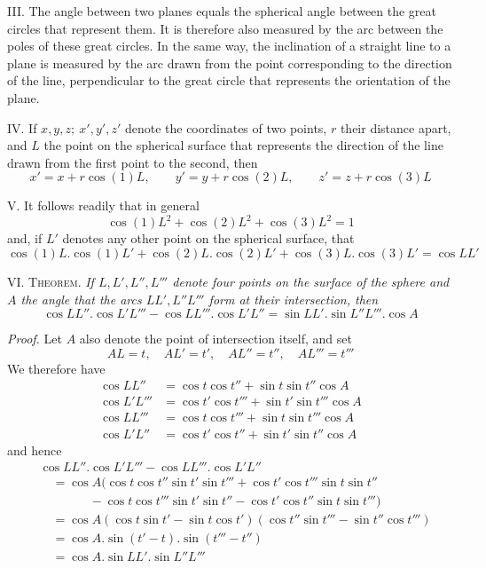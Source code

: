 \par\indent{}%
III. The angle between two planes equals the spherical angle between the great circles that represent them. It is therefore also measured by the arc between the poles of these great circles. In the same way, the inclination of a straight line to a plane is measured by the arc drawn from the point corresponding to the direction of the line, perpendicular to the great circle that represents the orientation of the plane.

IV. If \(x,y,z;\ x',y',z'\) denote the coordinates of two points, \(r\) their distance apart, and \(L\) the point on the spherical surface that represents the direction of the line drawn from the first point to the second, then
\[
x'=x+r\cos(1)L,\qquad y'=y+r\cos(2)L,\qquad z'=z+r\cos(3)L
\]
\par\indent V. It follows readily that in general
\[
\cos(1)L^2+\cos(2)L^2+\cos(3)L^2=1
\]
\noindent and, if \(L'\) denotes any other point on the spherical surface, that
\[
\cos(1)L\mathord{.}\cos(1)L'+\cos(2)L\mathord{.}\cos(2)L'+\cos(3)L\mathord{.}\cos(3)L'=\cos LL'
\]
\par\indent VI. \textsc{Theorem.} \textit{If \(L,L',L'',L'''\) denote four points on the surface of the sphere and \(A\) the angle that the arcs \(LL',L''L'''\) form at their intersection, then}
\[
\cos LL''\mathord{.}\cos L'L'''-\cos LL'''\mathord{.}\cos L'L''=\sin LL'\mathord{.}\sin L''L'''\mathord{.}\cos A
\]
\par\indent\textit{Proof.} Let \(A\) also denote the point of intersection itself, and set
\[
AL=t,\quad AL'=t',\quad AL''=t'',\quad AL'''=t'''
\]
\noindent We therefore have
\[
\begin{aligned}
\cos LL''&=\cos t\cos t''+\sin t\sin t''\cos A\\
\cos L'L'''&=\cos t'\cos t'''+\sin t'\sin t'''\cos A\\
\cos LL'''&=\cos t\cos t'''+\sin t\sin t'''\cos A\\
\cos L'L''&=\cos t'\cos t''+\sin t'\sin t''\cos A
\end{aligned}
\]
\noindent and hence
\[
\begin{aligned}
&\cos LL''\mathord{.}\cos L'L'''-\cos LL'''\mathord{.}\cos L'L''\\
&\quad=\cos A(\cos t\cos t''\sin t'\sin t'''+\cos t'\cos t'''\sin t\sin t''\\
&\qquad\qquad-\cos t\cos t'''\sin t'\sin t''-\cos t'\cos t''\sin t\sin t''')\\
&\quad=\cos A(\cos t\sin t'-\sin t\cos t')(\cos t''\sin t'''-\sin t''\cos t''')\\
&\quad=\cos A\mathord{.}\sin(t'-t)\mathord{.}\sin(t'''-t'')\\
&\quad=\cos A\mathord{.}\sin LL'\mathord{.}\sin L''L'''
\end{aligned}
\]
